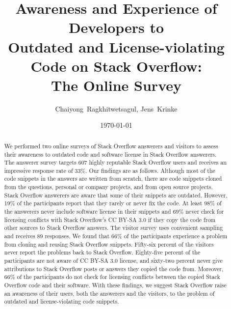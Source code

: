 \documentclass{svjour3}                     %
\begin{document}
\title{Awareness and Experience of Developers to\\ Outdated and License-violating Code on Stack Overflow:\\ The Online Survey}


\author{Chaiyong~Ragkhitwetsagul, Jens~Krinke}


\institute{Chaiyong Ragkhitwetsagul~(\Letter), Jens Krinke \at
              Computer Science Department., University College London, UK \\
              Tel.: +44 (0)20 7679,  Fax: +44 (0)20 7387 1397\\
              \email{\{ucabagk, j.krinke\}@ucl.ac.uk}           %
}

\date{\today}


\maketitle

\begin{abstract}
We performed two online surveys of Stack Overflow answerers and visitors to
assess their awareness to outdated code and software license in Stack Overflow
answerers. The answerer survey targets 607 highly reputable Stack Overflow users
and receives an impressive response rate of 33\%. Our findings are as follows.
Although most of the code snippets in the answers are written from scratch,
there are code snippets cloned from the questions, personal or company projects,
and from open source projects. Stack Overflow answerers are aware that some of
their snippets are outdated. However, 19\% of the participants report that they
rarely or never fix the code. At least 98\% of the answerers never include
software license in their snippets and 69\% never check for licensing conflicts
with Stack Overflow's CC BY-SA 3.0 if they copy the code from other sources to
Stack Overflow answers. The visitor survey uses convenient sampling and receives
89 responses. We found that 66\% of the participants experience a problem from
cloning and reusing Stack Overflow snippets. Fifty-six percent of the visitors
never report the problems back to Stack Overflow. Eighty-five percent of the
participants are not aware of CC BY-SA 3.0 license, and sixty-two percent never
give attributions to Stack Overflow posts or answers they copied the code from.
Moreover, 66\% of the participants do not check for licensing conflicts between
the copied Stack Overflow code and their software. With these findings, we
suggest Stack Overflow raise an awareness of their users, both the answerers and
the visitors, to the problem of outdated and license-violating code snippets.
\end{abstract}
\end{document}
